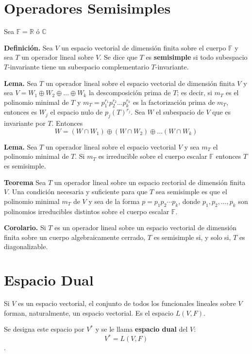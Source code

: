 \newpage
\section{{\Large Operadores Semisimples}}

Sea $\mathbb{F}=\mathbb{R}$ ó $\mathbb{C}$

\textbf{Definición.} Sea $V$ un espacio vectorial de dimensión
finita sobre el cuerpo $\mathbb{F}$ y sea $T$ un operador
lineal sobre $V$. Se dice que $T$ es \textbf{semisimple} si
todo subespacio $T$-invariante tiene un subespacio
complementario $T$-invariante.

\textbf{Lema.} Sea $T$ un operador lineal sobre el espacio
vectorial de dimensión finita $V$ y sea $V = W_1\oplus W_2 \oplus
\dots \oplus W_k$ la descomposición prima de $T$; es decir,
si $m_T$ es el polinomio minimal de $T$ y $m_T = p_1^{r_1}p_2^{r_2}
\dots p_k^{r_k}$ es la factorización prima de $m_T$,
entonces es $W_j$ el espacio nulo de $p_j(T)^{r_j}$. Sea $W$ el
subespacio de $V$ que es invariante por $T$. Entonces
$$W=(W\cap W_1)\oplus (W\cap W_2)\oplus \dots (W \cap W_k) $$

\textbf{Lema.} Sea $T$ un operador lineal sobre el espacio
vectorial $V$ y sea $m_T$ el polinomio minimal de $T$. Si $m_T$
es irreducìble sobre el cuerpo escalar $\mathbb{F}$ entonces
$T$ es semisimple.

\textbf{Teorema} Sea $T$ un operador lineal sobre un espacio
rectorial de dimensión finita $V$. Una condición necesaria y
suficiente para que $T$ sea semisimple es que el polinomio
minimal $m_T$ de $V$ y sea de la forma $p = p_1 p_2 \cdots
p_k$, donde $p_1, p_2, \dots, p_k$ son polinomios irreducibles
distintos sobre el cuerpo escalar $\mathbb{F}$.

\textbf{Corolario.} Si $T$ es un operador lineal sobre un
espacio vectorial de dimensión finita sobre un cuerpo
algebraicamente cerrado, $T$ es semisimple si, y solo si,
$T$ es diagonalizable.

\section{Espacio Dual}

Si $V$ es un espacio vectorial, el conjunto de todos los
funcionales lineales sobre $V$ forman, naturalmente, un
espacio vectorial. Es el espacio $L(V, F)$.

Se designa este espacio por $V^{\ast}$ y se le llama
\textbf{espacio dual} del $V$: $$V^{\ast} = L(V, F)$$.